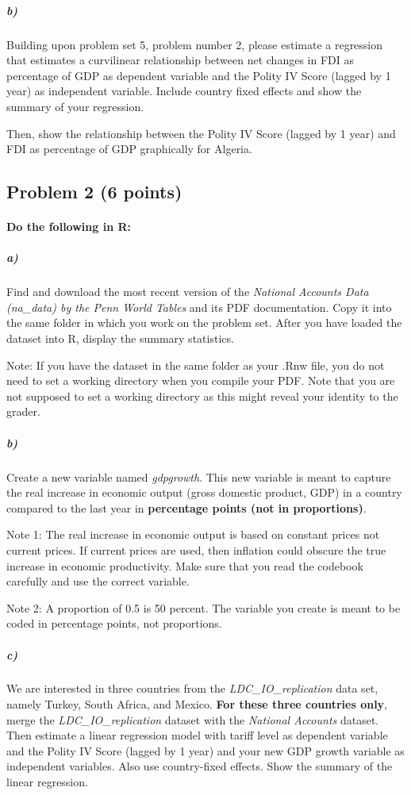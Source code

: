 \documentclass[12pt]{article}
\begin{document}
\subparagraph{b)} Building upon problem set 5, problem number 2, please estimate a regression that estimates a curvilinear relationship between net changes in FDI as percentage of GDP as dependent variable and the Polity IV Score (lagged by 1 year) as independent variable. Include country fixed effects and show the summary of your regression.

Then, show the relationship between the Polity IV Score (lagged by 1 year) and FDI as percentage of GDP graphically for Algeria.



\subsection*{Problem 2 (6 points)}

\paragraph{Do the following in R:}

\subparagraph{a)} Find and download the most recent version of the \textit{National Accounts Data (na\_data) by the Penn World Tables} and its PDF documentation. Copy it into the same folder in which you work on the problem set. After you have loaded the dataset into R, display the summary statistics.

Note: If you have the dataset in the same folder as your .Rnw file, you do not need to set a working directory when you compile your PDF. Note that you are not supposed to set a working directory as this might reveal your identity to the grader.

\subparagraph{b)} Create a new variable named \textit{gdpgrowth}. This new variable is meant to capture the real increase in economic output (gross domestic product, GDP) in a country compared to the last year in \textbf{percentage points (not in proportions)}.

Note 1: The real increase in economic output is based on constant prices not current prices. If current prices are used, then inflation could obscure the true increase in economic productivity. Make sure that you read the codebook carefully and use the correct variable.

Note 2: A proportion of 0.5 is 50 percent. The variable you create is meant to be coded in percentage points, not proportions.

\subparagraph{c)} We are interested in three countries from the \textit{LDC\_IO\_replication} data set, namely Turkey, South Africa, and Mexico. \textbf{For these three countries only}, merge the \textit{LDC\_IO\_replication} dataset with the \textit{National Accounts} dataset. Then estimate a linear regression model with tariff level as dependent variable and the Polity IV Score (lagged by 1 year) and your new GDP growth variable as independent variables. Also use country-fixed effects. Show the summary of the linear regression.
\end{document}
